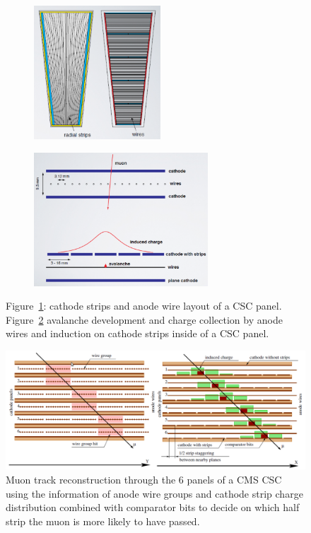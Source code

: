 	\begin{figure}[H]
		\begin{subfigure}{0.4\linewidth}
			\centering
			\includegraphics[height = 5cm]{fig/chapt2/CSC_layout.png}
			\caption{\label{fig:CSC-layout:A}}
		\end{subfigure}
		\begin{subfigure}{0.6\linewidth}
			\centering
			\includegraphics[height = 5cm]{fig/chapt2/CSC_avalanche.png}
			\caption{\label{fig:CSC-layout:B}}
		\end{subfigure}
		\caption{\label{fig:CSC-layout} Figure~\ref{fig:CSC-layout:A}: cathode strips and anode wire layout of a CSC panel. Figure~\ref{fig:CSC-layout:B} avalanche development and charge collection by anode wires and induction on cathode strips inside of a CSC panel.}
	\end{figure}
	
	\begin{figure}[H]
		\centering
		\includegraphics[width=\textwidth]{fig/chapt2/CSC_track.png}
		\caption{\label{fig:CSC-track} Muon track reconstruction through the 6 panels of a CMS CSC using the information of anode wire groups and cathode strip charge distribution combined with comparator bits to decide on which half strip the muon is more likely to have passed.}
	\end{figure}
	
